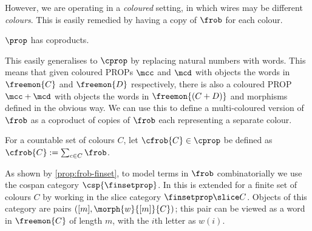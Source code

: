 However, we are operating in a \emph{coloured} setting, in which wires may
be different \emph{colours}.
This is easily remedied by having a copy of \(\frob\) for each colour.

\begin{theorem}
    \(\prop\) has coproducts.
\end{theorem}

This easily generalises to \(\cprop\) by replacing natural numbers with words.
This means that given coloured PROPs \(\mcc\) and \(\mcd\) with objects the
words in \(\freemon{C}\) and \(\freemon{D}\) respectively, there is also a
coloured PROP \(\mcc + \mcd\) with objects the words in \(\freemon{(C + D)}\)
and morphisms defined in the obvious way.
We can use this to define a multi-coloured version of \(\frob\) as
a coproduct of copies of \(\frob\) each representing a separate colour.

\begin{definition}
    \label{def:coloured-frob}
    For a countable set of colours \(C\), let \(\cfrob{C} \in \cprop\) be
    defined as \(\cfrob{C} := \sum_{c \in C}\frob\).
\end{definition}

As shown by \cref{prop:frob-finset}, to model terms in \(\frob\) combinatorially
we use the cospan category \(\csp{\finsetprop}\).
In \cite{bonchi2022string} this is extended for a finite set of colours \(C\) by
working in the slice category \(\finsetprop \slice C\).
Objects of this category are pairs \(([m], \morph{w}{[m]}{C})\); this pair can
be viewed as a word in \(\freemon{C}\) of length \(m\), with the \(i\)th letter
as \(w(i)\).

